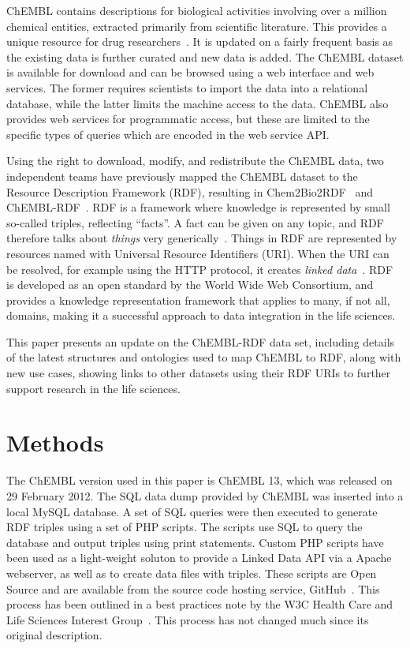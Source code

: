 \documentclass[10pt]{bmc_article}
\newenvironment{bmcformat}{\begin{raggedright}\baselineskip20pt\sloppy\setboolean{publ}{false}}{\end{raggedright}\baselineskip20pt\sloppy}
\begin{document}
\begin{bmcformat}
ChEMBL contains descriptions for biological activities involving over a million chemical 
entities, extracted primarily from scientific literature. This provides a unique resource for drug researchers~\cite{Gaulton2012,Warr2009}.
It is updated on a fairly frequent basis as the existing data is further curated and new data is added. 
The ChEMBL dataset is available for download and can be browsed using a web interface and web services.
The former requires scientists to import the data into a relational database, while the 
latter limits the machine access to the data. ChEMBL also provides web services for programmatic
access, but these are limited to the specific types of queries which are encoded in the web service API. 

Using the right to download, modify, and redistribute the ChEMBL data, two independent teams
have previously mapped the ChEMBL dataset to the Resource Description Framework (RDF), resulting
in Chem2Bio2RDF~\cite{Chen2010} and ChEMBL-RDF~\cite{Willighagen2011}. RDF is a framework where
knowledge is represented by small so-called triples, reflecting ``facts''. A fact can
be given on any topic, and RDF therefore talks about \textit{things} very generically~\cite{Miller:04:RP}. Things in RDF
are represented by resources named with Universal Resource Identifiers (URI). When the URI can be resolved, 
for example using the HTTP protocol, it creates \emph{linked data}~\cite{Samwald2011}. RDF is
developed as an open standard by the World Wide Web Consortium, and provides a knowledge
representation framework that applies to many, if not all, domains, making it a successful 
approach to data integration in the life sciences.

This paper presents an update on the ChEMBL-RDF data set, including details of the latest structures
and ontologies used to map ChEMBL to RDF, along with new use cases, showing 
links to other datasets using their RDF URIs to further support research in the life sciences.

\section*{Methods}
\label{s2}

The ChEMBL version used in this paper is ChEMBL 13, which was released on 29 February 2012.
The SQL data dump provided by ChEMBL was inserted into a local MySQL database. A set of SQL queries 
were then executed to generate RDF triples using a set of PHP scripts. The scripts use SQL to
query the database and output triples using print statements. Custom PHP scripts have been used
as a light-weight soluton to provide a Linked Data API via a Apache webserver, as well as to
create data files with triples. These scripts are Open Source 
and are available from the source code hosting service, GitHub~\cite{ChEMBLRDFGitHub}. This process 
has been outlined in a best practices note by the W3C Health Care and Life Sciences Interest
Group~\cite{Marshall2012}. This process has not changed much since its original description.


\end{bmcformat}
\end{document}
